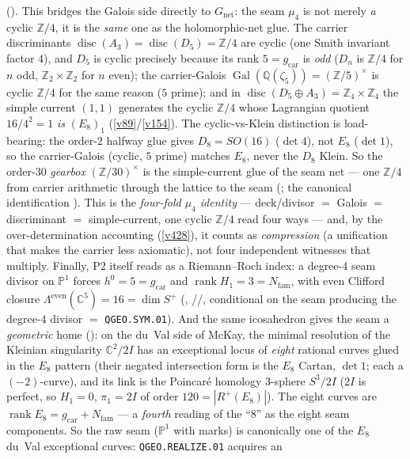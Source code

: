 \documentclass[11pt,a4paper]{article}
\newcommand{\gcar}{g_{\mathrm{car}}}
\newcommand{\Nfam}{N_{\mathrm{fam}}}
\newcommand{\Z}{\mathbb Z}
\newcommand{\PP}{\mathbb P}
\begin{document}
\begin{keybox}
{().} This bridges the Galois side directly to $G_{\mathrm{net}}$: the seam
$\mu_4$ is not merely \emph{a} cyclic $\Z/4$, it is the \emph{same} one as the holomorphic-net glue. The
carrier discriminants $\operatorname{disc}(A_3)=\operatorname{disc}(D_5)=\Z/4$ are cyclic (one Smith
invariant factor $4$), and $D_5$ is cyclic precisely because its rank $5=\gcar$ is \emph{odd} ($D_n$ is
$\Z/4$ for $n$ odd, $\Z_2\times\Z_2$ for $n$ even); the carrier-Galois
$\operatorname{Gal}(\mathbb Q(\zeta_5))=(\Z/5)^\times$ is cyclic $\Z/4$ for the same reason ($5$ prime); and
in $\operatorname{disc}(D_5\oplus A_3)=\Z_4\times\Z_4$ the simple current $(1,1)$ generates the cyclic $\Z/4$
whose Lagrangian quotient $16/4^2=1$ \emph{is} $(E_8)_1$ (\vref{v89}/\vref{v154}). The cyclic-vs-Klein
distinction is load-bearing: the order-$2$ halfway glue gives $D_8=SO(16)$ ($\det4$), not $E_8$ ($\det1$),
so the carrier-Galois (cyclic, $5$ prime) matches $E_8$, never the $D_8$ Klein. So the order-$30$
\emph{gearbox} $(\Z/30)^\times$ is the simple-current glue of the seam net --- one $\Z/4$ from carrier
arithmetic through the lattice to the seam (\mE; the canonical identification \mC). This is the
\emph{four-fold $\mu_4$ identity} --- deck/divisor $=$ Galois $=$ discriminant $=$ simple-current, one
cyclic $\Z/4$ read four ways --- and, by the over-determination accounting (\vref{v428}), it counts as
\emph{compression} (a unification that makes the carrier less axiomatic), not four independent witnesses
that multiply.
Finally, P2 itself reads as a Riemann--Roch index: a degree-$4$
seam divisor on $\PP^1$ forces $h^0{=}5{=}\gcar$ and $\operatorname{rank}H_1{=}3{=}\Nfam$, with even Clifford
closure $\Lambda^{\mathrm{even}}(\mathbb C^5)=16=\dim S^+$ (, \mE/\mC/\mO,
conditional on the seam producing the degree-$4$ divisor $=$ \texttt{QGEO.SYM.01}). And the same
icosahedron gives the seam a \emph{geometric} home (): on the du~Val side
of McKay, the minimal resolution of the Kleinian singularity $\mathbb C^2/2I$ has an exceptional locus of
\emph{eight} rational curves glued in the $E_8$ pattern (their negated intersection form is the $E_8$ Cartan,
$\det1$; each a $(-2)$-curve), and its link is the Poincar\'e homology $3$-sphere $S^3/2I$ ($2I$ is perfect,
so $H_1=0$, $\pi_1=2I$ of order $120=|R^+(E_8)|$). The eight curves are $\operatorname{rank}E_8=\gcar+\Nfam$
--- a \emph{fourth} reading of the ``$8$'' as the eight seam components. So the raw seam ($\PP^1$ with marks)
is canonically one of the $E_8$ du~Val exceptional curves: \texttt{QGEO.REALIZE.01} acquires an

\end{keybox}
\end{document}
